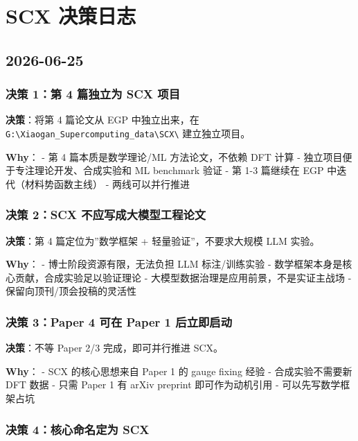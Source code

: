 \documentclass[
  12pt,
]{ctexart}
\author{SCX}
\date{2026}
\begin{document}
\section{SCX 决策日志}\label{scx-ux51b3ux7b56ux65e5ux5fd7}

\subsection{2026-06-25}\label{section}

\subsubsection{决策 1：第 4 篇独立为 SCX
项目}\label{ux51b3ux7b56-1ux7b2c-4-ux7bc7ux72ecux7acbux4e3a-scx-ux9879ux76ee}

\textbf{决策}：将第 4 篇论文从 EGP 中独立出来，在
\texttt{G:\textbackslash{}Xiaogan\_Supercomputing\_data\textbackslash{}SCX\textbackslash{}}
建立独立项目。

\textbf{Why}： - 第 4 篇本质是数学理论/ML 方法论文，不依赖 DFT 计算 -
独立项目便于专注理论开发、合成实验和 ML benchmark 验证 - 第 1-3 篇继续在
EGP 中迭代（材料势函数主线） - 两线可以并行推进

\subsubsection{决策 2：SCX
不应写成大模型工程论文}\label{ux51b3ux7b56-2scx-ux4e0dux5e94ux5199ux6210ux5927ux6a21ux578bux5de5ux7a0bux8bbaux6587}

\textbf{决策}：第 4 篇定位为''数学框架 + 轻量验证''，不要求大规模 LLM
实验。

\textbf{Why}： - 博士阶段资源有限，无法负担 LLM 标注/训练实验 -
数学框架本身是核心贡献，合成实验足以验证理论 -
大模型数据治理是应用前景，不是实证主战场 - 保留向顶刊/顶会投稿的灵活性

\subsubsection{决策 3：Paper 4 可在 Paper 1
后立即启动}\label{ux51b3ux7b56-3paper-4-ux53efux5728-paper-1-ux540eux7acbux5373ux542fux52a8}

\textbf{决策}：不等 Paper 2/3 完成，即可并行推进 SCX。

\textbf{Why}： - SCX 的核心思想来自 Paper 1 的 gauge fixing 经验 -
合成实验不需要新 DFT 数据 - 只需 Paper 1 有 arXiv preprint
即可作为动机引用 - 可以先写数学框架占坑

\subsubsection{决策 4：核心命名定为
SCX}\label{ux51b3ux7b56-4ux6838ux5fc3ux547dux540dux5b9aux4e3a-scx}
\end{document}
